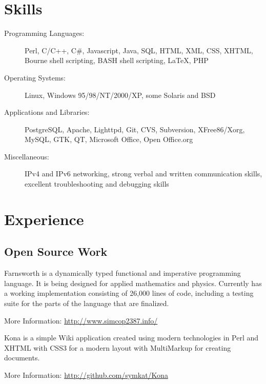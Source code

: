 \documentclass{resume}
\author{Ryan Voots}
\begin{document}
\maketitle
\vspace{0.1in}

\section{Skills}
\begin{description}
\item[Programming Languages:]
Perl, C/C++, C\#, Javascript, Java, SQL, HTML, XML, CSS, XHTML, Bourne shell scripting, BASH shell scripting, \LaTeX, PHP
\item[Operating Systems:]
Linux, Windows 95/98/NT/2000/XP, some Solaris and BSD
\item[Applications and Libraries:]
PostgreSQL, Apache, Lighttpd, Git, CVS, Subversion, XFree86/Xorg, MySQL, GTK, QT, Microsoft Office, Open Office.org
\item[Miscellaneous:]
IPv4 and IPv6 networking, strong verbal and written communication skills, excellent troubleshooting and debugging skills
\end{description}

\section{Experience}

\subsection{Open Source Work}


\begin{compactitem}
\item Farnsworth is a dynamically typed functional and imperative programming language.  
It is being designed for applied mathematics and physics.  Currently has a working implementation 
consisting of 26,000 lines of code, including a testing suite for the parts of the language that are finalized.
\item More Information: \url{http://www.simcop2387.info/}
\end{compactitem}


\begin{compactitem}
\item Kona is a simple Wiki application created using modern technologies in Perl and XHTML 
with CSS3 for a modern layout with MultiMarkup for creating documents.
\item More Information: \url{http://github.com/symkat/Kona}
\end{compactitem}
\end{document}
